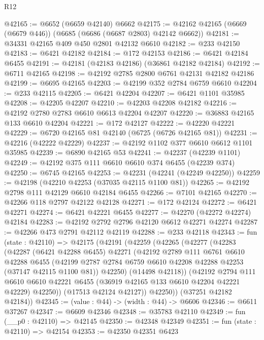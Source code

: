 \begin{lexlean}{R12}
\begin{coremodule}
@42165 := @6652 (@6659 @42140) @6662
@42175 := @42162 @42165 (@6669 (@6679 @446)) (@6685 (@6686 (@6687 @2803) @42142 @6662))
@42181 := @34331 @42165 @409 @450 @2801 @42132 @6610
@42182 := @233 @42150
@42183 := @6421 @42182
@42184 := @172 @42153
@42186 := @6421 @42184 @6455
@42191 := @42181 (@42183 @42186) (@36861 @42182 @42184)
@42192 := @6711 @42165
@42198 := @42192 @2785 @2800 @6761 @42131 @42182 @42186
@42199 := @6695 @42165
@42203 := @42199 @352 @2784 @6759 @6610
@42204 := @233 @42115
@42205 := @6421 @42204
@42207 := @6421 @1101 @35985
@42208 := @42205 @42207
@42210 := @42203 @42208 @42182
@42216 := @42192 @2780 @2783 @6610 @6613 @42204 @42207
@42220 := @36883 @42165 @133 @6610 @42204
@42221 := @172 @42127
@42222 := @42220 @42221
@42229 := @6720 @42165 @81 @42140 (@6725 (@6726 @42165 @81))
@42231 := @42216 (@42222 @42229)
@42237 := @42192 @1102 @377 @6610 @6612 @1101 @35985
@42239 := @6890 @42165 @53
@42241 := @42237 (@42239 @1101)
@42249 := @42192 @375 @111 @6610 @6610 @374 @6455 (@42239 @374)
@42250 := @6745 @42165
@42253 := @42231 (@42241 (@42249 @42250))
@42259 := @42198 (@42210 @42253 (@37035 @42115 @1100 @81))
@42265 := @42192 @2798 @111 @42129 @6610 @42184 @6455
@42266 := @7101 @42165
@42270 := @42266 @118 @2797 @42122 @42128
@42271 := @172 @42124
@42272 := @6421 @42271
@42274 := @6421 @42221 @6455
@42277 := @42270 (@42272 @42274) @42184
@42283 := @42192 @2792 @2796 @42120 @6612 @42271 @42274
@42287 := @42266 @473 @2791 @42112 @42119
@42288 := @233 @42118
@42343 := fun (state : @42110) =>
  @42175
    (@42191
      (@42259
        (@42265
          (@42277
            (@42283
              (@42287
                (@6421 @42288 @6455)
                @42271
                (@42192
                  @2789
                  @111
                  @6761
                  @6610
                  @42288
                  @6455
                  (@42199 @2787 @2784 @6759 @6610 @42208 @42288 @42253 (@37147 @42115 @1100 @81))
                  @42250)
                (@14498 @42118))
              (@42192
                @2794
                @111
                @6610
                @6610
                @42221
                @6455
                (@36919 @42165 @133 @6610 @42204 @42221 @42229)
                @42250))
            (@17513 @42124 @42127))
          @42250))
      (@37251 @42182 @42184))
@42345 := (value : @44) -> (width : @44) -> @6606
@42346 := @6611 @37267
@42347 := @6609 @42346
@42348 := @35783 @42110
@42349 := fun (__p0 : @42110) => @42145
@42350 := @42348 @42349
@42351 := fun (state : @42110) => @42154
@42353 := @42350 @42351 @6423

\end{coremodule}
\end{lexlean}
